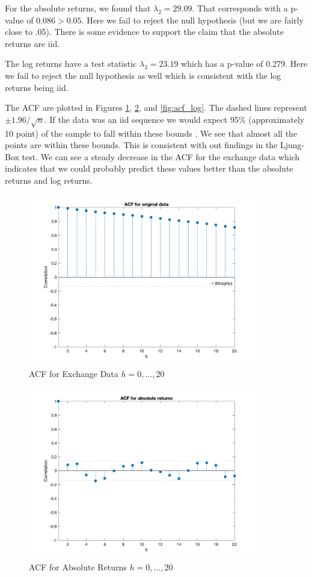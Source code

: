 \documentclass{article}
\begin{document}
For the absolute returns, we found that $\lambda_2 = 29.09$. That corresponds with a p-value of $0.086 > 0.05$. Here we fail to reject the null hypothesis (but we are fairly close to .05). There is some evidence to support the claim that the absolute returns are iid.

The log returns have a test statistic $\lambda_3 = 23.19$ which has a p-value of 0.279. Here we fail to reject the null hypothesis as well which is consistent with the log returns being iid.

The ACF are plotted in Figures \ref{fig:acf_exchange}, \ref{fig:acf_abs}, and \ref{fig:acf_log}.
The dashed lines represent $\pm 1.96 / \sqrt{n}$.
If the data was an iid sequence we would expect 95\% (approximately 10 point) of the sample to fall within these bounds \cite{bd}.
We see that almost all the points are within these bounds.
This is consistent with out findings in the Ljung-Box test.
We can see a steady decrease in the ACF for the exchange data which indicates that we could probably predict these values better than the absolute returns and log returns.

\begin{figure}[H]
\includegraphics[width=10cm]{plots/acf_exchange.png}
\centering
\caption{ACF for Exchange Data $h = 0,\ldots, 20$}
\label{fig:acf_exchange}
\end{figure}

\begin{figure}[H]
\includegraphics[width=10cm]{plots/acf_abs_returns.png}
\centering
\caption{ACF for Absolute Returns $h = 0,\ldots, 20$}
\label{fig:acf_abs}
\end{figure}
\end{document}
